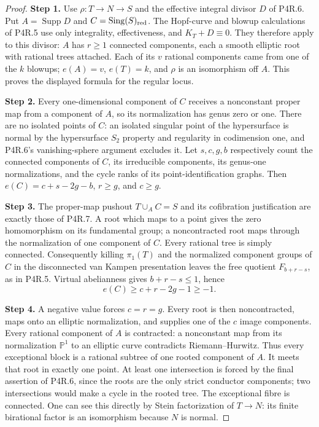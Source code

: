 \begin{proof}
\noindent\textbf{Step 1.} Use $\rho:T\to N\to S$ and the effective
integral divisor $D$ of P4R.6. Put
$A=\operatorname{Supp}D$ and
$C=\operatorname{Sing}(S)_{\rm red}$.
The Hopf-curve and blowup calculations of
P4R.5 use only integrality, effectiveness,
and $K_T+D\equiv0$. They therefore apply
to this divisor: $A$ has $r\ge1$ connected
components, each a smooth elliptic root
with rational trees attached. Each of its
$v$ rational components came from one of
the $k$ blowups; $e(A)=v$, $e(T)=k$, and
$\rho$ is an isomorphism off $A$. This
proves the displayed formula for the
regular locus.

\noindent\textbf{Step 2.} Every one-dimensional component of $C$
receives a nonconstant proper map from a
component of $A$, so its normalization
has genus zero or one. There are no
isolated points of $C$: an isolated
singular point of the hypersurface is
normal by the hypersurface $S_2$ property
and regularity in codimension one, and
P4R.6's vanishing-sphere argument excludes
it. Let $s,c,g,b$ respectively count the
connected components of $C$, its
irreducible components, its genus-one
normalizations, and the cycle ranks of
its point-identification graphs.
Then $e(C)=c+s-2g-b$, $r\ge g$, and
$c\ge g$.

\noindent\textbf{Step 3.} The proper-map pushout $T\cup_A C=S$
and its cofibration justification are
exactly those of P4R.7. A root which
maps to a point gives the zero
homomorphism on its fundamental group;
a noncontracted root maps through the
normalization of one component of $C$.
Every rational tree is simply connected.
Consequently killing $\pi_1(T)$ and
the normalized component groups of $C$
in the disconnected van Kampen
presentation leaves the free quotient
$F_{b+r-s}$, as in P4R.5. Virtual
abelianness gives $b+r-s\le1$, hence
\[
 e(C)\ge c+r-2g-1\ge-1.
\]

\noindent\textbf{Step 4.} A negative value forces $c=r=g$.
Every root is then noncontracted, maps
onto an elliptic normalization, and
supplies one of the $c$ image components.
Every rational component of $A$ is
contracted: a nonconstant map from its
normalization $\mathbb P^1$ to an
elliptic curve contradicts
Riemann--Hurwitz. Thus every exceptional
block is a rational subtree of one
rooted component of $A$. It meets that
root in exactly one point. At least one
intersection is forced by the final
assertion of P4R.6, since the roots are
the only strict conductor components;
two intersections would make a cycle
in the rooted tree. The exceptional
fibre is connected. One can see this
directly by Stein factorization of
$T\to N$: its finite birational factor
is an isomorphism because $N$ is normal.


\end{proof}
